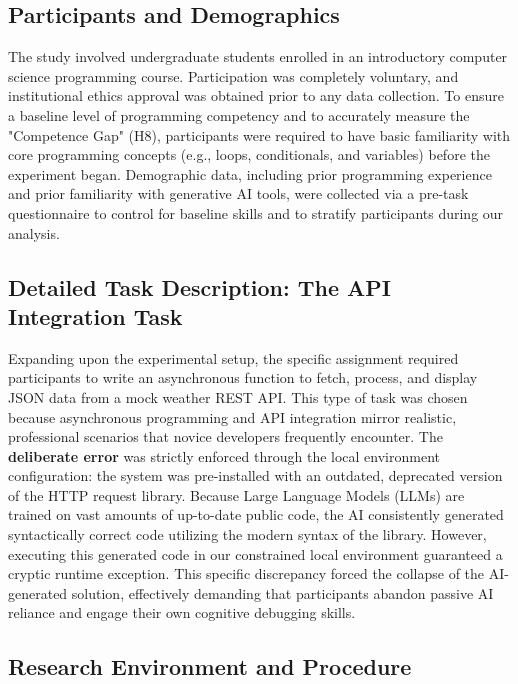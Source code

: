 \documentclass[../tanulmany.tex]{subfiles}
\begin{document}
\subsection{Participants and Demographics}

The study involved undergraduate students enrolled in an introductory computer science programming course. 
Participation was completely voluntary, and institutional ethics approval was obtained prior to any data collection. 
To ensure a baseline level of programming competency and to accurately measure the "Competence Gap" (H8), participants were required to have basic familiarity with core programming concepts (e.g., loops, conditionals, and variables) before the experiment began. 
Demographic data, including prior programming experience and prior familiarity with generative AI tools, were collected via a pre-task questionnaire to control for baseline skills and to stratify participants during our analysis.
\cite{prather2024widening} \cite{kusper2025we} 

\subsection{Detailed Task Description: The API Integration Task}

Expanding upon the experimental setup, the specific assignment required participants to write an asynchronous function to fetch, process, and display JSON data from a mock weather REST API. This type of task was chosen because asynchronous programming and API integration mirror realistic, professional scenarios that novice developers frequently encounter. 
The \textbf{deliberate error} was strictly enforced through the local environment configuration: the system 
was pre-installed with an outdated, deprecated version of the HTTP request library. Because Large Language 
Models (LLMs) are trained on vast amounts of up-to-date public code, the AI consistently generated 
syntactically correct code utilizing the modern syntax of the library. However, executing this generated 
code in our constrained local environment guaranteed a cryptic runtime exception. This specific discrepancy 
forced the collapse of the AI-generated solution, effectively demanding that participants abandon passive AI 
reliance and engage their own cognitive debugging skills.
\cite{shen2026how}

\subsection{Research Environment and Procedure}
\end{document}
